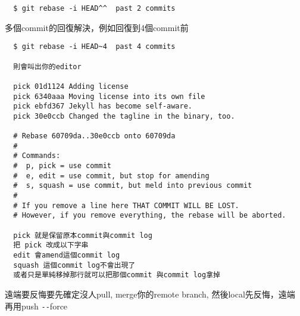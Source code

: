   \begin{verbatim}
  $ git rebase -i HEAD^^  past 2 commits
  \end{verbatim}
  多個commit的回復解決，例如回復到4個commit前
  \begin{verbatim}
  $ git rebase -i HEAD~4  past 4 commits

  則會叫出你的editor

  pick 01d1124 Adding license
  pick 6340aaa Moving license into its own file
  pick ebfd367 Jekyll has become self-aware.
  pick 30e0ccb Changed the tagline in the binary, too.

  # Rebase 60709da..30e0ccb onto 60709da
  #
  # Commands:
  #  p, pick = use commit
  #  e, edit = use commit, but stop for amending
  #  s, squash = use commit, but meld into previous commit
  #
  # If you remove a line here THAT COMMIT WILL BE LOST.
  # However, if you remove everything, the rebase will be aborted.

  pick 就是保留原本commit與commit log
  把 pick 改成以下字串
  edit 會amend這個commit log
  squash 這個commit log不會出現了
  或者只是單純移掉那行就可以把那個commit 與commit log拿掉
  \end{verbatim}
  遠端要反悔要先確定沒人pull, merge你的remote branch, 然後local先反悔，遠端
  再用push \verb=--=force
